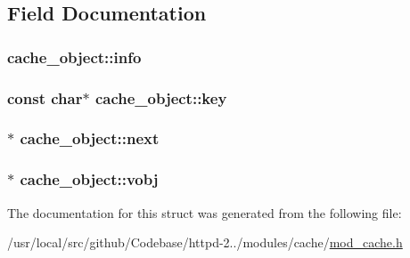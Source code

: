 \subsection{Field Documentation}
\subsubsection[{\texorpdfstring{info}{info}}]{ cache\+\_\+object\+::info}\hypertarget{structcache__object_ab4b2aae3e314dfa7abe8304c33cedb83}{}\label{structcache__object_ab4b2aae3e314dfa7abe8304c33cedb83}
\subsubsection[{\texorpdfstring{key}{key}}]{\setlength{\rightskip}{0pt plus 5cm}const char$\ast$ cache\+\_\+object\+::key}\hypertarget{structcache__object_a6dfc38a2cd449d6ede42716a80e11f92}{}\label{structcache__object_a6dfc38a2cd449d6ede42716a80e11f92}
\subsubsection[{\texorpdfstring{next}{next}}]{$\ast$ cache\+\_\+object\+::next}\hypertarget{structcache__object_a6fb62d2321b20d87b84058fa1ec50a39}{}\label{structcache__object_a6fb62d2321b20d87b84058fa1ec50a39}
\subsubsection[{\texorpdfstring{vobj}{vobj}}]{$\ast$ cache\+\_\+object\+::vobj}\hypertarget{structcache__object_adaac6e5e7bdd26391c8fadfc7588ff40}{}\label{structcache__object_adaac6e5e7bdd26391c8fadfc7588ff40}


The documentation for this struct was generated from the following file\+:\begin{DoxyCompactItemize}
\item 
/usr/local/src/github/\+Codebase/httpd-\/2../modules/cache/\hyperlink{mod__cache_8h}{mod\+\_\+cache.\+h}\end{DoxyCompactItemize}
